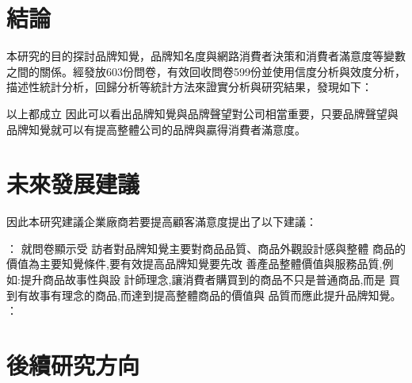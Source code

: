 \section{結論}
本研究的目的探討品牌知覺，品牌知名度與網路消費者決策和消費者滿意度等變數之間的關係。經發放603份問卷，有效回收問卷599份並使用信度分析與效度分析，描述性統計分析，回歸分析等統計方法來證實分析與研究結果，發現如下：
\begin{enumerate}
\end{enumerate}
以上都成立
因此可以看出品牌知覺與品牌聲望對公司相當重要，只要品牌聲望與品牌知覺就可以有提高整體公司的品牌與贏得消費者滿意度。


\section{未來發展建議}

因此本研究建議企業廠商若要提高顧客滿意度提出了以下建議：
\begin{enumerate}
：
就問卷顯示受 訪者對品牌知覺主要對商品品質、商品外觀設計感與整體 商品的價值為主要知覺條件,要有效提高品牌知覺要先改 善產品整體價值與服務品質,例如:提升商品故事性與設 計師理念,讓消費者購買到的商品不只是普通商品,而是 買到有故事有理念的商品,而達到提高整體商品的價值與 品質而應此提升品牌知覺。
：
\end{enumerate}
\section{後續研究方向}

\blindtext[1]

